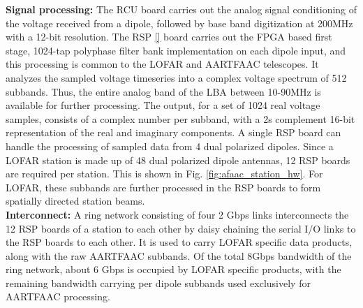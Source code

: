 \documentclass{ws-jai}
\begin{document}
\noindent  \textbf {Signal  processing:} The  RCU board  carries out  the analog
signal conditioning of the voltage received from a dipole, followed by base band
digitization at  200MHz with a 12-bit  resolution. The RSP \ref{}  board carries
out the FPGA based first stage, 1024-tap polyphase filter bank implementation on
each  dipole input,  and this  processing is  common to  the LOFAR  and AARTFAAC
telescopes. It  analyzes the sampled  voltage timeseries into a  complex voltage
spectrum  of 512  subbands. Thus,  the  entire analog  band of  the LBA  between
10-90MHz is available for further processing. The output, for a set of 1024 real
voltage samples, consists of a complex  number per subband, with a 2s complement
16-bit representation of  the real and imaginary components. A  single RSP board
can handle the processing of sampled  data from 4 dual polarized dipoles.  Since
a LOFAR station is made up of  48 dual polarized dipole antennas, 12 RSP boards
are required per station.  This is shown in Fig. \ref{fig:afaac_station_hw}. For
LOFAR, these subbands are further processed  in the RSP boards to form spatially
directed station beams.\\



\noindent \textbf {Interconnect:} A ring network consisting of four 2 Gbps links
interconnects the 12 RSP boards of a station to each other by daisy chaining the
serial I/O  links to the  RSP boards to  each other. It  is used to  carry LOFAR
specific data products, along with the raw AARTFAAC subbands. Of the total 8Gbps
bandwidth  of the  ring  network,  about 6 Gbps  is  occupied  by LOFAR  specific
products,  with  the  remaining  bandwidth carrying  per  dipole  subbands  used
exclusively for AARTFAAC processing.\\
\end{document}
